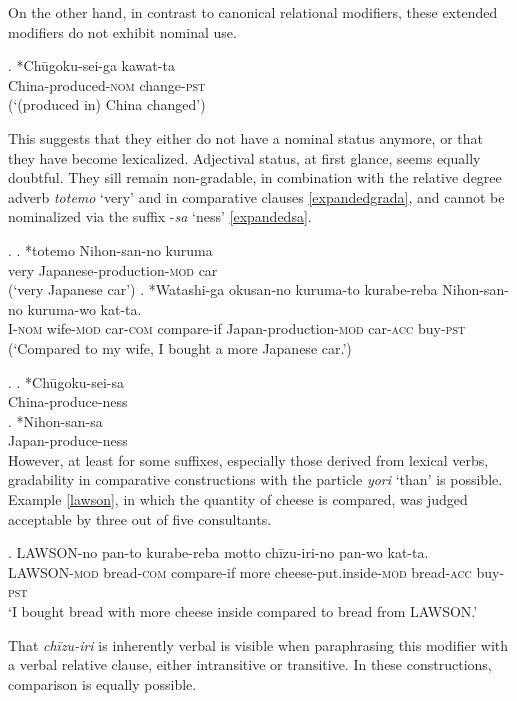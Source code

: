 On the other hand, in contrast to canonical relational modifiers, these extended modifiers do not exhibit nominal use.

\exg. *Chūgoku-sei-ga kawat-ta\\
China-produced-\textsc{nom} change-\textsc{pst}\\
(`(produced in) China changed’)

This suggests that they either do not have a nominal status anymore, or that they have become lexicalized. Adjectival status, at first glance, seems equally doubtful. They sill remain non-gradable, in combination with the relative degree adverb \textit{totemo} `very’ and in comparative clauses \ref{expandedgrada}, and cannot be nominalized via the suffix -\textit{sa} `ness’ \ref{expandedsa}.

\ex. \label{expandedgrada} \ag. *totemo Nihon-san-no kuruma\\
very Japanese-production-\textsc{mod} car\\
(`very Japanese car’)
\bg. *Watashi-ga okusan-no kuruma-to kurabe-reba Nihon-san-no kuruma-wo kat-ta.\\
I-\textsc{nom} wife-\textsc{mod} car-\textsc{com} compare-if Japan-production-\textsc{mod} car-\textsc{acc} buy-\textsc{pst}\\
(`Compared to my wife, I bought a more Japanese car.’)

\ex. \label{expandedsa} \ag. *Chūgoku-sei-sa\\
China-produce-ness\\
\bg. *Nihon-san-sa\\
Japan-produce-ness\\

However, at least for some suffixes, especially those derived from lexical verbs, gradability in comparative constructions with the particle \textit{yori} `than’ is possible. Example \ref{lawson}, in which the quantity of cheese is compared, was judged acceptable by three out of five consultants.

\exg. LAWSON-no pan-to kurabe-reba motto chīzu-iri-no pan-wo kat-ta.\\
LAWSON-\textsc{mod} bread-\textsc{com} compare-if more cheese-put.inside-\textsc{mod} bread-\textsc{acc} buy-\textsc{pst}\\
`I bought bread with more cheese inside compared to bread from LAWSON.’ \label{lawson}

That \textit{chīzu-iri} is inherently verbal is visible when paraphrasing this modifier with a verbal relative clause, either intransitive or transitive. In these constructions, comparison is equally possible.

